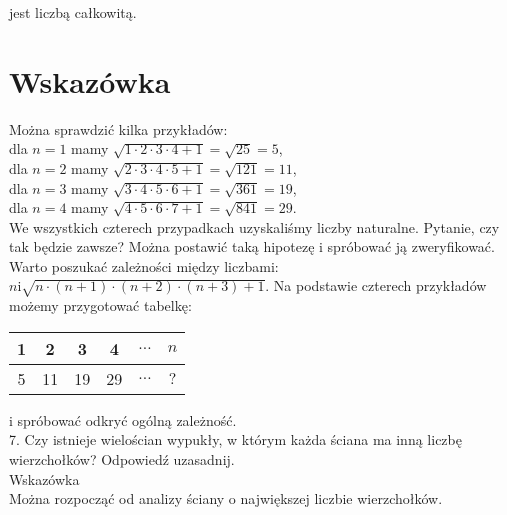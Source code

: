 \documentclass[10pt]{article}
\begin{document}
jest liczbą całkowitą.

\section*{Wskazówka}
Można sprawdzić kilka przykładów:\\
dla \(n=1\) mamy \(\sqrt{1 \cdot 2 \cdot 3 \cdot 4+1}=\sqrt{25}=5\),\\
dla \(n=2\) mamy \(\sqrt{2 \cdot 3 \cdot 4 \cdot 5+1}=\sqrt{121}=11\),\\
dla \(n=3\) mamy \(\sqrt{3 \cdot 4 \cdot 5 \cdot 6+1}=\sqrt{361}=19\),\\
dla \(n=4\) mamy \(\sqrt{4 \cdot 5 \cdot 6 \cdot 7+1}=\sqrt{841}=29\).\\
We wszystkich czterech przypadkach uzyskaliśmy liczby naturalne. Pytanie, czy tak będzie zawsze? Można postawić taką hipotezę i spróbować ją zweryfikować.\\
Warto poszukać zależności między liczbami: \(n \mathrm{i} \sqrt{n \cdot(n+1) \cdot(n+2) \cdot(n+3)+1}\). Na podstawie czterech przykładów możemy przygotować tabelkę:

\begin{center}
\begin{tabular}{|c|c|c|c|c|c|}
\hline
1 & 2 & 3 & 4 & \(\ldots\) & \(n\) \\
\hline
5 & 11 & 19 & 29 & \(\ldots\) & \(?\) \\
\hline
\end{tabular}
\end{center}

i spróbować odkryć ogólną zależność.\\
7. Czy istnieje wielościan wypukły, w którym każda ściana ma inną liczbę wierzchołków? Odpowiedź uzasadnij.\\
Wskazówka\\
Można rozpocząć od analizy ściany o największej liczbie wierzchołków.
\end{document}
